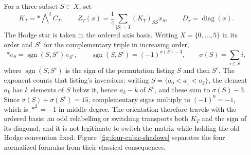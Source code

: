For a three-subset \(S\subset X\), set
\[
 K_T=*\!\bigwedge\nolimits^3 C_T,
 \qquad
 Z_T(x)=\frac14\sum_{|S|=3}(K_T)_{SS}x_S,
 \qquad D_x=\operatorname{diag}(x).
\]
The Hodge star is taken in the ordered axis basis.  Writing \(X=\{0,\dots,5\}\)
in its order and \(S^{c}\) for the complementary triple in increasing order,
\[
 *e_S=\operatorname{sgn}(S,S^{c})\,e_{S^{c}},
 \qquad
 \operatorname{sgn}(S,S^{c})=(-1)^{\sigma(S)-3},
 \qquad
 \sigma(S)=\sum_{i\in S}i,
\]
where \(\operatorname{sgn}(S,S^{c})\) is the sign of the permutation listing
\(S\) and then \(S^{c}\).  The exponent counts that listing's inversions:
writing \(S=\{a_0<a_1<a_2\}\), the element \(a_k\) has \(k\) elements of \(S\)
below it, hence \(a_k-k\) of \(S^{c}\), and these sum to \(\sigma(S)-3\).
Since \(\sigma(S)+\sigma(S^{c})=15\), complementary signs multiply to
\((-1)^{9}=-1\),
which is \(*^2=-1\) in middle degree.  The orientation therefore travels with
the ordered basis: an odd relabelling or switching transports both \(K_T\) and
the sign of its diagonal, and it is not legitimate to switch the matrix while
holding the old Hodge convention fixed.  Figure~\ref{fig:four-cubic-shadows}
separates the four normalized formulas from their classical consequences.

